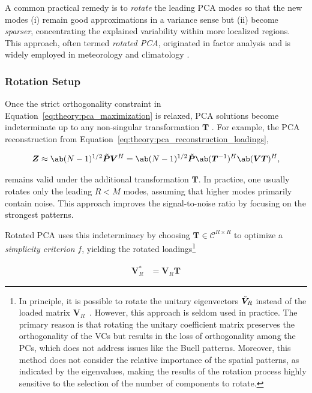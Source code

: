 A common practical remedy is to \emph{rotate} the leading PCA modes so that the new modes (i) remain good approximations in a variance sense but (ii) become \emph{sparser}, concentrating the explained variability within more localized regions. This approach, often termed \textit{rotated PCA}, originated in factor analysis \cite[cf.][pp. 269]{jolliffe_principal_2002} and is widely employed in meteorology and climatology \cite{richman_rotation_1986,lim_east_2015,lian_evaluation_2012}.

\subsubsection{Rotation Setup}
Once the strict orthogonality constraint in Equation~\eqref{eq:theory:pca_maximization} is relaxed, PCA solutions become indeterminate up to any non-singular transformation $\bm{T}$ \cite[e.g.][p. 305]{richman_rotation_1986}. For example, the PCA reconstruction from Equation~\eqref{eq:theory:pca_reconstruction_loadings},

\begin{align}
    \bm{Z} \approx \ab(N-1)^{1/2} \bmn{P} \bm{V}^H = \ab(N-1)^{1/2} \bmn{P} \ab(\bm{T}^{-1})^H \ab(\bm{V} \bm{T} )^H,
\end{align}

remains valid under the additional transformation $\bm{T}$. In practice, one usually rotates only the leading $R<M$ modes, assuming that higher modes primarily contain noise. This approach improves the signal-to-noise ratio by focusing on the strongest patterns.

Rotated PCA uses this indeterminacy by choosing $\bm{T} \in \mathcal{C}^{R \times R}$ to optimize a \emph{simplicity criterion} $f$, yielding the rotated loadings\footnote{In principle, it is possible to rotate the unitary eigenvectors $\tilde{\bm{V}}_R$ instead of the loaded matrix $\bm{V}_R$~\cite{mestasnunez_orthogonality_2000,jolliffe_principal_2002}. However, this approach is seldom used in practice. The primary reason is that rotating the unitary coefficient matrix preserves the orthogonality of the VCs but results in the loss of orthogonality among the PCs, which does not address issues like the Buell patterns. Moreover, this method does not consider the relative importance of the spatial patterns, as indicated by the eigenvalues, making the results of the rotation process highly sensitive to the selection of the number of components to rotate.}

\begin{align}
    \bm{V}_R^* &= \bm{V}_R \bm{T}
\end{align}

